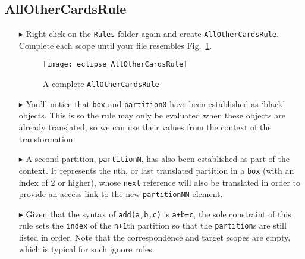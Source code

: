 \newpage
\hypertarget{allCards tex}{}
\subsection{AllOtherCardsRule}
\texHeader

\begin{itemize}

\item[$\blacktriangleright$] Right click on the \texttt{Rules} folder again and create \texttt{AllOtherCardsRule}. Complete each scope until your file resembles
Fig.~\ref{eclipse:allOtherCardsRuleComplete}.

\vspace{0.5cm}

\begin{figure}[htbp]
\begin{center}
  \texttt{[image: eclipse\_AllOtherCardsRule]}
  \caption{A complete \texttt{AllOtherCardsRule}}
  \label{eclipse:allOtherCardsRuleComplete}
\end{center}
\end{figure}

\item[$\blacktriangleright$] You'll notice that \texttt{box} and \texttt{partition0} have been established as `black' objects. This is so the rule may only be
evaluated when these objects are already translated, so we can use their values from the context of the transformation.

\vspace{0.5cm}

\item[$\blacktriangleright$] A second partition, \texttt{partitionN}, has also been established as part of the context. It represents the \texttt{n}th, or last
translated partition in a \texttt{box} (with an index of 2 or higher), whose \texttt{next} reference will also be translated in order to provide an access
link to the new \texttt{partitionNN} element.

\newpage

\item[$\blacktriangleright$] Given that the syntax of \texttt{add(a,b,c)} is \texttt{a+b=c}, the sole constraint of this rule sets the \texttt{index}
of the \texttt{n+1}th partition so that the \texttt{partition}s are still listed in order. Note that the correspondence and target scopes are empty, which is typical
for such ignore rules.

\vspace{0.5cm}


\end{itemize}
